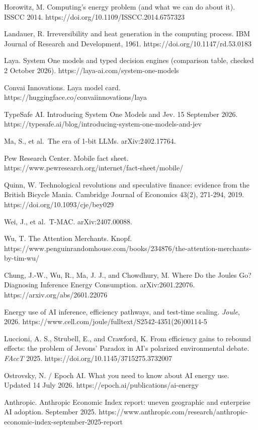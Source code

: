 \documentclass[
  10pt,
]{article}
\begin{document}
Horowitz, M. Computing's energy problem (and what we can do about it).
ISSCC 2014. https://doi.org/10.1109/ISSCC.2014.6757323

Landauer, R. Irreversibility and heat generation in the computing
process. IBM Journal of Research and Development, 1961.
https://doi.org/10.1147/rd.53.0183

Laya. System One models and typed decision engines (comparison table,
checked 2 October 2026). https://laya-ai.com/system-one-models

Convai Innovations. Laya model card.
https://huggingface.co/convaiinnovations/laya

TypeSafe AI. Introducing System One Models and Jev. 15 September 2026.
https://typesafe.ai/blog/introducing-system-one-models-and-jev

Ma, S., et al.~The era of 1-bit LLMs. arXiv:2402.17764.

Pew Research Center. Mobile fact sheet.
https://www.pewresearch.org/internet/fact-sheet/mobile/

Quinn, W. Technological revolutions and speculative finance: evidence
from the British Bicycle Mania. Cambridge Journal of Economics 43(2),
271-294, 2019. https://doi.org/10.1093/cje/bey029

Wei, J., et al.~T-MAC. arXiv:2407.00088.

Wu, T. The Attention Merchants. Knopf.
https://www.penguinrandomhouse.com/books/234876/the-attention-merchants-by-tim-wu/

Chung, J.-W., Wu, R., Ma, J. J., and Chowdhury, M. Where Do the Joules
Go? Diagnosing Inference Energy Consumption. arXiv:2601.22076.
https://arxiv.org/abs/2601.22076

Energy use of AI inference, efficiency pathways, and test-time scaling.
\emph{Joule}, 2026.
https://www.cell.com/joule/fulltext/S2542-4351(26)00114-5

Luccioni, A. S., Strubell, E., and Crawford, K. From efficiency gains to
rebound effects: the problem of Jevons' Paradox in AI's polarized
environmental debate. \emph{FAccT} 2025.
https://doi.org/10.1145/3715275.3732007

Ostrovsky, N. / Epoch AI. What you need to know about AI energy use.
Updated 14 July 2026. https://epoch.ai/publications/ai-energy

Anthropic. Anthropic Economic Index report: uneven geographic and
enterprise AI adoption. September 2025.
https://www.anthropic.com/research/anthropic-economic-index-september-2025-report
\end{document}
